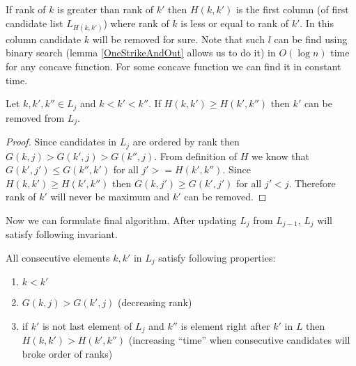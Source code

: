 If rank of $k$ is greater than rank of $k'$ then $H(k,k')$ is the first column
(of first candidate list $L_{H(k,k')}$) where rank of $k$ is less or equal to
rank of $k'$. In this column candidate $k$ will be removed for sure.  Note that
such $l$ can be find using binary search (lemma \ref{OneStrikeAndOut} allows us
to do it) in $O(\log n)$ time for any concave function. For some concave
function we can find it in constant time.

\begin{lemma}\label{TimeLemma}
Let $k,k',k''\in L_j$ and $k<k'<k''$. If $H(k,k')\geq H(k',k'')$ then $k'$ can be
removed from $L_j$.
\end{lemma}

\begin{proof}
Since candidates in $L_j$ are ordered by rank then $G(k,j)>G(k',j)>G(k'',j)$.
From definition of $H$ we know that 
$G(k',j')\leq G(k'',k')$ for  all $j'>=H(k',k'')$. Since
$H(k,k')\geq H(k',k'')$ then $G(k,j')\geq G(k',j')$ for all $j'<j$. Therefore rank
of $k'$ will never be maximum and $k'$ can be removed.

\end{proof}

Now we can formulate final algorithm. After updating $L_j$ from $L_{j-1}$,
$L_j$ will satisfy following invariant.
\begin{invariant}\label{LogGapInvariant}
All consecutive elements $k,k'$ in $L_j$ satisfy following properties:
\begin{enumerate}
\item $k<k'$
\item $G(k,j)>G(k',j)$ (decreasing rank)
\item if $k'$ is not last element of $L_j$ and $k''$ is element right after $k'$
in $L$ then $H(k,k')> H(k',k'')$ (increasing ``time'' when consecutive
candidates will broke order of ranks)
\end{enumerate}
\end{invariant}

